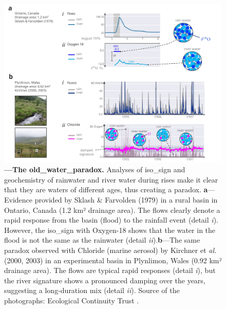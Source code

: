 \documentclass[./main_en.tex]{subfiles}
\begin{document}
\begin{figure}[t!] 
\centering				
\includegraphics[width=0.98\linewidth]{figs/fig_paradox2_en.jpg}		
\caption[The old water paradox]
{\textbf{---\;The \gls{old_water_paradox}.}
    Analyses of \gls{iso_sign} and geochemistry of rainwater and river water during rises make it clear that they are waters of different ages, thus creating a paradox. \;\textbf{a}\;---\;Evidence provided by Sklash \& Farvolden (1979) \cite{sklash1979} in a rural basin in Ontario, Canada (1.2 km² drainage area). The flows clearly denote a rapid response from the basin (flood) to the rainfall event (detail \textrm{\textit{i}}). However, the \gls{iso_sign} with Oxygen-18 shows that the water in the flood is not the same as the rainwater (detail \textrm{\textit{ii}}).\;\textbf{b}\;---\;The same paradox observed with Chloride (marine aerosol) by Kirchner et \textit{al.} (2000, 2003) \cite{kirchner2000, Kirchner2003} in an experimental basin in Plynlimon, Wales (0.92 km² drainage area). The flows are typical rapid responses (detail \textrm{\textit{i}}), but the river signature shows a pronounced damping over the years, suggesting a long-duration mix (detail \textrm{\textit{ii}}). Source of the photographs: Ecological Continuity Trust \cite{ect_plynlimon}.
}
\label{fig:hydro:paradox2} 		
\end{figure}
\end{document}
